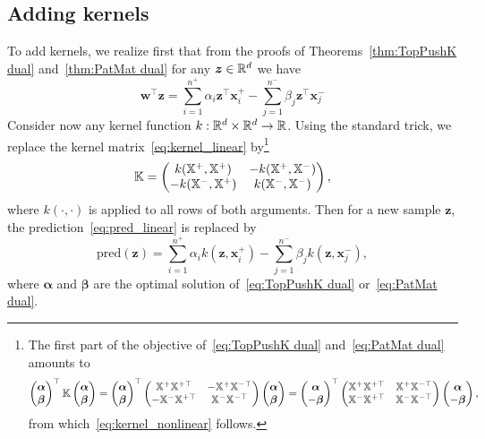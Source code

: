 \subsection{Adding kernels}

To add kernels, we realize first that from the proofs of Theorems~\ref{thm:TopPushK dual} and~\ref{thm:PatMat dual} for any $\bm{z}\in\mathbb{R}^d$ we have
\begin{equation}\label{eq:pred_linear}
  \bm{w}^\top \bm{z} = \sum_{i = 1}^{n^+} \alpha_i \bm{z}^\top \bm{x}^+_i - \sum_{j = 1}^{n^-} \beta_j \bm{z}^\top \bm{x}^-_j
\end{equation}
Consider now any kernel function $k:\mathbb{R}^d\times\mathbb{R}^d\to\mathbb{R}$. Using the standard trick, we replace the kernel matrix~\eqref{eq:kernel_linear} by\footnote{
The first part of the objective of~\eqref{eq:TopPushK dual} and~\eqref{eq:PatMat dual} amounts to
\begin{equation*}
  \begin{pmatrix} \bm{\alpha} \\ \bm{\beta} \end{pmatrix}^\top \mathbb{K} \begin{pmatrix} \bm{\alpha} \\ \bm{\beta} \end{pmatrix}
  = \begin{pmatrix} \bm{\alpha} \\ \bm{\beta} \end{pmatrix}^\top \begin{pmatrix} \mathbb{X}^+ \mathbb{X}^{+\top} & -\mathbb{X}^+ \mathbb{X}^{-\top} \\ -\mathbb{X}^- \mathbb{X}^{+\top} & \mathbb{X}^- \mathbb{X}^{-\top}  \end{pmatrix}\begin{pmatrix} \bm{\alpha} \\ \bm{\beta} \end{pmatrix}
  = \begin{pmatrix} \bm{\alpha} \\ -\bm{\beta} \end{pmatrix}^\top \begin{pmatrix} \mathbb{X}^+ \mathbb{X}^{+\top} & \mathbb{X}^+ \mathbb{X}^{-\top} \\ \mathbb{X}^- \mathbb{X}^{+\top} & \mathbb{X}^- \mathbb{X}^{-\top}  \end{pmatrix}\begin{pmatrix} \bm{\alpha} \\ -\bm{\beta} \end{pmatrix},
\end{equation*}
from which~\eqref{eq:kernel_nonlinear} follows.}
\begin{equation}\label{eq:kernel_nonlinear}
  \mathbb{K} = \begin{pmatrix} k(\mathbb{X}^+, \mathbb{X}^{+}) & -k(\mathbb{X}^+, \mathbb{X}^{-}) \\ -k(\mathbb{X}^-, \mathbb{X}^{+}) & k(\mathbb{X}^-, \mathbb{X}^{-})  \end{pmatrix},
\end{equation}
where $k(\cdot,\cdot)$ is applied to all rows of both arguments. Then for a new sample $\bm{z}$, the prediction~\eqref{eq:pred_linear} is replaced by
\begin{equation}\label{eq:pred_nonlinear}
  \textrm{pred}(\bm{z}) = \sum_{i = 1}^{n^+} \alpha_i k\left(\bm{z}, \bm{x}^+_i\right) - \sum_{j = 1}^{n^-} \beta_j k\left(\bm{z}, \bm{x}^-_j\right),
\end{equation}
where $\bm{\alpha}$ and $\bm{\beta}$ are the optimal solution of~\eqref{eq:TopPushK dual} or~\eqref{eq:PatMat dual}.

